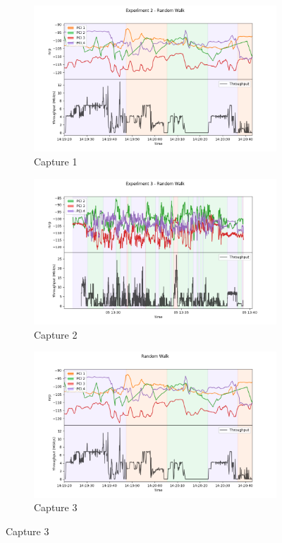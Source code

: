 \begin{figure}
    \centering
    \caption{Moving Capture of Thoughput}
    \label{fig:real:4enb:walk}
    \begin{subfigure}{\linewidth}
        \centering
        \includegraphics[width=0.75\linewidth]{src//img/4enbEx2RandomWalk.png}
        \caption{Capture 1}
        \label{fig:real:4enb:walk1}
    \end{subfigure}
    \begin{subfigure}{\linewidth}
        \centering
        \includegraphics[width=0.75\linewidth]{src//img/4enbEx3RandomWalk.png}
        \caption{Capture 2}
        \label{fig:real:4enb:walk2}
    \end{subfigure}
    \begin{subfigure}{\linewidth}
        \centering
        \includegraphics[width=0.75\linewidth]{src//img/4enbEx4RandomWalk.png}
        \caption{Capture 3}
        \label{fig:real:4enb:walk3}
    \end{subfigure}
\end{figure}

